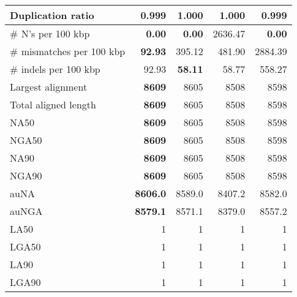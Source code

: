 \documentclass[12pt,a4paper]{article}
\begin{document}
\begin{table}[ht]
\begin{center}
\begin{tabular}{|l*{4}{|r}|}
Duplication ratio & {\bf 0.999} & 1.000 & 1.000 & {\bf 0.999} \\ \hline
\# N's per 100 kbp & {\bf 0.00} & {\bf 0.00} & 2636.47 & {\bf 0.00} \\ \hline
\# mismatches per 100 kbp & {\bf 92.93} & 395.12 & 481.90 & 2884.39 \\ \hline
\# indels per 100 kbp & 92.93 & {\bf 58.11} & 58.77 & 558.27 \\ \hline
Largest alignment & {\bf 8609} & 8605 & 8508 & 8598 \\ \hline
Total aligned length & {\bf 8609} & 8605 & 8508 & 8598 \\ \hline
NA50 & {\bf 8609} & 8605 & 8508 & 8598 \\ \hline
NGA50 & {\bf 8609} & 8605 & 8508 & 8598 \\ \hline
NA90 & {\bf 8609} & 8605 & 8508 & 8598 \\ \hline
NGA90 & {\bf 8609} & 8605 & 8508 & 8598 \\ \hline
auNA & {\bf 8606.0} & 8589.0 & 8407.2 & 8582.0 \\ \hline
auNGA & {\bf 8579.1} & 8571.1 & 8379.0 & 8557.2 \\ \hline
LA50 & 1 & 1 & 1 & 1 \\ \hline
LGA50 & 1 & 1 & 1 & 1 \\ \hline
LA90 & 1 & 1 & 1 & 1 \\ \hline
LGA90 & 1 & 1 & 1 & 1 \\ \hline
\end{tabular}
\end{center}
\end{table}
\end{document}
